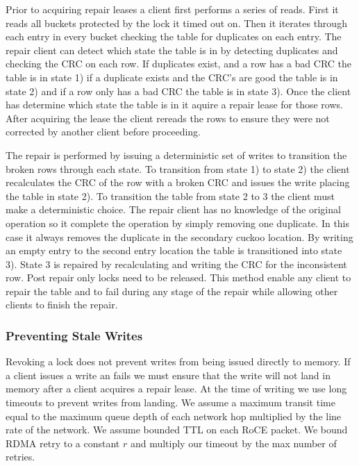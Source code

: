 Prior to acquiring repair leases a client first performs a
series of reads. First it reads all buckets protected by the
lock it timed out on. Then it iterates through each entry in
every bucket checking the table for duplicates on each
entry. The repair client can detect which state the table is
in by detecting duplicates and checking the CRC on each row.
If duplicates exist, and a row has a bad CRC the table is in
state 1) if a duplicate exists and the CRC's are good the
table is in state 2) and if a row only has a bad CRC the
table is in state 3). Once the client has determine which
state the table is in it aquire a repair lease for those
rows. After acquiring the lease the client rereads the rows
to ensure they were not corrected by another client before
proceeding. 

The repair is performed by issuing a deterministic set of
writes to transition the broken rows through each state. To
transition from state 1) to state 2) the client recalculates
the CRC of the row with a broken CRC and issues the write
placing the table in state 2). To transition the table from
state 2 to 3 the client must make a deterministic choice.
The repair client has no knowledge of the original operation
so it complete the operation by simply removing one
duplicate. In this case it always removes the duplicate in
the secondary cuckoo location. By writing an empty entry to
the second entry location the table is transitioned into
state 3). State 3 is repaired by recalculating and writing
the CRC for the inconsistent row. Post repair only locks
need to be released. This method enable any client to repair
the table and to fail during any stage of the repair while
allowing other clients to finish the repair.

\subsubsection{Preventing Stale Writes}

Revoking a lock does not prevent writes from being issued
directly to memory. If a client issues a write an fails we
must ensure that the write will not land in memory after a
client acquires a repair lease. At the time of writing we
use long timeouts to prevent writes from landing. We assume
a maximum transit time equal to the maximum queue depth of
each network hop multiplied by the line rate of the network.
We assume bounded TTL on each RoCE packet. We bound RDMA
retry to a constant $r$ and multiply our timeout by the max
number of retries.

